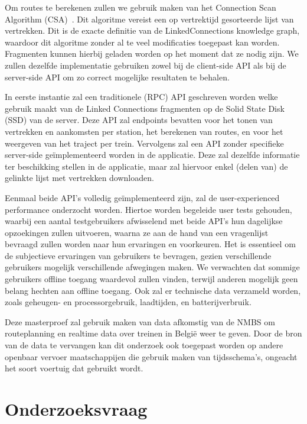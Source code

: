 Om routes te berekenen zullen we gebruik maken van het Connection Scan Algorithm (CSA)~\citep{strasser13,strasser14,strasser17}. Dit algoritme vereist een op vertrektijd gesorteerde lijst van vertrekken. Dit is de exacte definitie van de LinkedConnections knowledge graph, waardoor dit algoritme zonder al te veel modificaties toegepast kan worden. Fragmenten kunnen hierbij geladen worden op het moment dat ze nodig zijn. We zullen dezelfde implementatie gebruiken zowel bij de client-side API als bij de server-side API om zo correct mogelijke resultaten te behalen. 

In eerste instantie zal een traditionele (RPC) API geschreven worden welke gebruik maakt van de Linked Connections fragmenten op de Solid State Disk (SSD) van de server. Deze API zal endpoints bevatten voor het tonen van vertrekken en aankomsten per station, het berekenen van routes, en voor het weergeven van het traject per trein. 
Vervolgens zal een API zonder specifieke server-side geïmplementeerd worden in de applicatie. Deze zal dezelfde informatie ter beschikking stellen in de applicatie, maar zal hiervoor enkel (delen van) de gelinkte lijst met vertrekken downloaden. 

Eenmaal beide API's volledig geïmplementeerd zijn, zal de user-experienced performance onderzocht worden. Hiertoe worden begeleide user tests gehouden, waarbij een aantal testgebruikers afwisselend met beide API's hun dagelijkse opzoekingen zullen uitvoeren, waarna ze aan de hand van een vragenlijst bevraagd zullen worden naar hun ervaringen en voorkeuren. Het is essentieel om de subjectieve ervaringen van gebruikers te bevragen, gezien verschillende gebruikers mogelijk verschillende afwegingen maken. We verwachten dat sommige gebruikers offline toegang waardevol zullen vinden, terwijl anderen mogelijk geen belang hechten aan offline toegang. Ook zal er technische data verzameld worden, zoals geheugen- en processorgebruik, laadtijden, en batterijverbruik. 

Deze masterproef zal gebruik maken van data afkomstig van de NMBS om routeplanning en realtime data over treinen in België weer te geven. Door de bron van de data te vervangen kan dit onderzoek ook toegepast worden op andere openbaar vervoer maatschappijen die gebruik maken van tijdsschema's, ongeacht het soort voertuig dat gebruikt wordt.

\section{Onderzoeksvraag}
 \label{sec:onderzoeksvraag}
 
